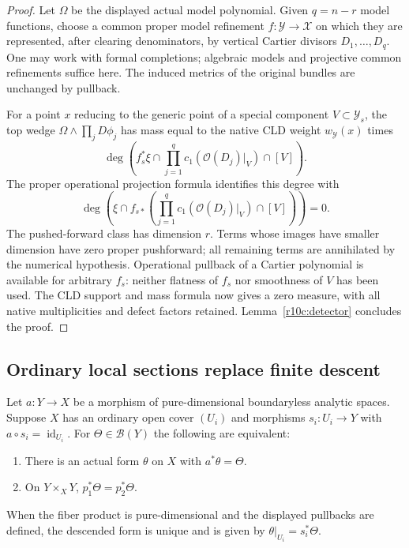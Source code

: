 \begin{proof}
Let $\Omega$ be the displayed actual model polynomial.  Given $q=n-r$
model functions, choose a common proper model refinement
$f:\mathcal Y\to\mathcal X$ on which they are represented, after
clearing denominators, by vertical Cartier divisors $D_1,\ldots,D_q$.
One may work with formal completions; algebraic models and projective
common refinements suffice here.  The induced metrics of the original
bundles are unchanged by pullback.

For a point $x$ reducing to the generic point of a special component
$V\subset\mathcal Y_s$, the top wedge
$\Omega\wedge\prod_jD\phi_j$ has mass equal to the native CLD weight
$w_{\mathcal Y}(x)$ times
\[
 \deg\left(f_s^*\xi\cap
       \prod_{j=1}^{q}c_1(\mathcal O(D_j)|_V)\cap[V]\right).
\]
The proper operational projection formula identifies this degree with
\[
 \deg\left(\xi\cap f_{s*}
       \left(\prod_{j=1}^{q}c_1(\mathcal O(D_j)|_V)\cap[V]\right)\right)=0.
\]
The pushed-forward class has dimension $r$.  Terms whose images have
smaller dimension have zero proper pushforward; all remaining terms are
annihilated by the numerical hypothesis.  Operational pullback of a
Cartier polynomial is available for arbitrary $f_s$: neither flatness of
$f_s$ nor smoothness of $V$ has been used.  The CLD support and mass
formula now gives a zero measure, with all native multiplicities and
defect factors retained.  Lemma~\ref{r10c:detector} concludes the proof.
\end{proof}

\subsection{Ordinary local sections replace finite descent}

\begin{lemma}
\label{r10c:split-descent}
Let $a:Y\to X$ be a morphism of pure-dimensional boundaryless analytic
spaces.  Suppose $X$ has an ordinary open cover $(U_i)$ and morphisms
$s_i:U_i\to Y$ with $a\circ s_i=\operatorname{id}_{U_i}$.
For $\Theta\in\mathcal B(Y)$ the following are equivalent:
\begin{enumerate}
\item There is an actual form $\theta$ on $X$ with $a^*\theta=\Theta$.
\item On $Y\times_XY$, $p_1^*\Theta=p_2^*\Theta$.
\end{enumerate}
When the fiber product is pure-dimensional and the displayed pullbacks
are defined, the descended form is unique and is given by
$\theta|_{U_i}=s_i^*\Theta$.
\end{lemma}

